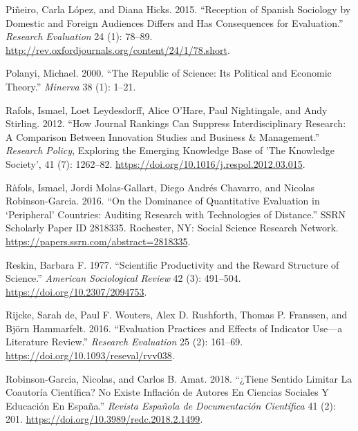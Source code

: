\documentclass[]{elsarticle} %
\begin{document}
\leavevmode\hypertarget{ref-pineiroReceptionSpanishSociology2015}{}%
Piñeiro, Carla López, and Diana Hicks. 2015. ``Reception of Spanish
Sociology by Domestic and Foreign Audiences Differs and Has Consequences
for Evaluation.'' \emph{Research Evaluation} 24 (1): 78--89.
\url{http://rev.oxfordjournals.org/content/24/1/78.short}.

\leavevmode\hypertarget{ref-polanyiRepublicScienceIts2000}{}%
Polanyi, Michael. 2000. ``The Republic of Science: Its Political and
Economic Theory.'' \emph{Minerva} 38 (1): 1--21.

\leavevmode\hypertarget{ref-rafolsHowJournalRankings2012}{}%
Rafols, Ismael, Loet Leydesdorff, Alice O'Hare, Paul Nightingale, and
Andy Stirling. 2012. ``How Journal Rankings Can Suppress
Interdisciplinary Research: A Comparison Between Innovation Studies and
Business \& Management.'' \emph{Research Policy}, Exploring the Emerging
Knowledge Base of 'The Knowledge Society', 41 (7): 1262--82.
\url{https://doi.org/10.1016/j.respol.2012.03.015}.

\leavevmode\hypertarget{ref-rafolsDominanceQuantitativeEvaluation2016}{}%
Ràfols, Ismael, Jordi Molas-Gallart, Diego Andrés Chavarro, and Nicolas
Robinson-Garcia. 2016. ``On the Dominance of Quantitative Evaluation in
`Peripheral' Countries: Auditing Research with Technologies of
Distance.'' SSRN Scholarly Paper ID 2818335. Rochester, NY: Social
Science Research Network.
\url{https://papers.ssrn.com/abstract=2818335}.

\leavevmode\hypertarget{ref-reskinScientificProductivityReward1977}{}%
Reskin, Barbara F. 1977. ``Scientific Productivity and the Reward
Structure of Science.'' \emph{American Sociological Review} 42 (3):
491--504. \url{https://doi.org/10.2307/2094753}.

\leavevmode\hypertarget{ref-rijckeEvaluationPracticesEffects2016}{}%
Rijcke, Sarah de, Paul F. Wouters, Alex D. Rushforth, Thomas P.
Franssen, and Björn Hammarfelt. 2016. ``Evaluation Practices and Effects
of Indicator Use---a Literature Review.'' \emph{Research Evaluation} 25
(2): 161--69. \url{https://doi.org/10.1093/reseval/rvv038}.

\leavevmode\hypertarget{ref-robinson-garciaTieneSentidoLimitar2018}{}%
Robinson-Garcia, Nicolas, and Carlos B. Amat. 2018. ``¿Tiene Sentido
Limitar La Coautoría Científica? No Existe Inflación de Autores En
Ciencias Sociales Y Educación En España.'' \emph{Revista Española de
Documentación Científica} 41 (2): 201.
\url{https://doi.org/10.3989/redc.2018.2.1499}.
\end{document}
